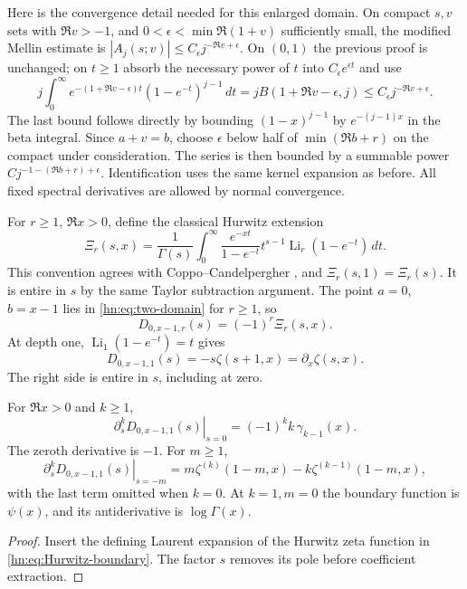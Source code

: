 Here is the convergence detail needed for this enlarged domain.
On compact $s,v$ sets with $\Re v>-1$, and $0<\epsilon<\min\Re(1+v)$ sufficiently small, the modified Mellin estimate is
$|A_j(s;v)|\le C_\epsilon j^{-\Re v+\epsilon}$.
On $(0,1)$ the previous proof is unchanged; on $t\ge1$ absorb
the necessary power of $t$ into $C_\epsilon e^{\epsilon t}$ and use
\[
 j\int_0^\infty e^{-(1+\Re v-\epsilon)t}
                  (1-e^{-t})^{j-1}\,dt
 =jB(1+\Re v-\epsilon,j)
 \le C_\epsilon j^{-\Re v+\epsilon}.
\]
The last bound follows directly by bounding
$(1-x)^{j-1}$ by $e^{-(j-1)x}$ in the beta integral.
Since $a+v=b$, choose $\epsilon$ below half of
$\min(\Re b+r)$ on the compact under consideration. The series
is then bounded by a summable power
$Cj^{-1-(\Re b+r)+\epsilon}$. Identification uses the same
kernel expansion as before. All fixed spectral derivatives are
allowed by normal convergence.

For $r\ge1$, $\Re x>0$, define the classical Hurwitz extension
\[
 \Xi_r(s,x)=\frac1{\Gamma(s)}\int_0^\infty
       \frac{e^{-xt}}{1-e^{-t}}t^{s-1}
                        \operatorname{Li}_r(1-e^{-t})\,dt.
\]
This convention agrees with Coppo--Candelpergher \cite{CC2010}, and
$\Xi_r(s,1)=\Xi_r(s)$. It is entire in $s$ by the same Taylor
subtraction argument. The point $a=0$, $b=x-1$ lies in
\eqref{hn:eq:two-domain} for $r\ge1$, so
\begin{equation}\label{hn:eq:generalized-boundary}
                  D_{0,x-1,r}(s)=(-1)^r\Xi_r(s,x).
\end{equation}
At depth one, $\operatorname{Li}_1(1-e^{-t})=t$ gives
\begin{equation}\label{hn:eq:Hurwitz-boundary}
 D_{0,x-1,1}(s)=-s\zeta(s+1,x)=\partial_x\zeta(s,x).
\end{equation}
The right side is entire in $s$, including at zero.

\begin{corollary}\label{hn:cor:Stieltjes}
For $\Re x>0$ and $k\ge1$,
\begin{equation}\label{hn:eq:generalized-Stieltjes}
 \boxed{\displaystyle
 \left.\partial_s^kD_{0,x-1,1}(s)\right|_{s=0}
      =(-1)^k k\,\gamma_{k-1}(x).}
\end{equation}
The zeroth derivative is $-1$. For $m\ge1$,
\[
 \left.\partial_s^kD_{0,x-1,1}(s)\right|_{s=-m}
 =m\zeta^{(k)}(1-m,x)-k\zeta^{(k-1)}(1-m,x),
\]
with the last term omitted when $k=0$.
At $k=1,m=0$ the boundary function is $\psi(x)$, and its
antiderivative is $\log\Gamma(x)$.
\end{corollary}
\begin{proof}
Insert the defining Laurent expansion of the Hurwitz zeta
function in \eqref{hn:eq:Hurwitz-boundary}. The factor $s$
removes its pole before coefficient extraction.
\end{proof}

